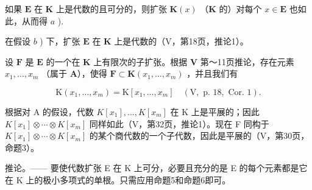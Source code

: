 如果 \(\mathbf{E}\) 在 \(\mathbf{K}\) 上是代数的且可分的，则扩张 \(\mathbf{K}(x)\) （\(\mathbf{K}\) 的）对每个 \(x \in \mathbf{E}\) 也如此，从而得 \(a\) ).

在假设 \(b\) ) 下，扩张 \(\mathbf{E}\) 在 \(\mathbf{K}\) 上是代数的（V，第18页，推论1）。

设 \(\mathbf{F}\) 是 \(\mathbf{E}\) 的一个在 \(\mathbf{K}\) 上有限次的子扩张。根据 \(\mathbf{V}\) 第～11页推论，存在元素 \(x_{1},\ldots ,x_{m}\) （属于 \(\mathbf{A}\)），使得 \(\mathbf{F}\subset \mathbf{K}(x_1,\dots,x_m)\) ，并且我们有

\[
\mathrm{K} \left(x _ {1}, \dots , x _ {m}\right) = \mathrm{K} \left[ x _ {1}, \dots , x _ {m} \right] \quad (\mathrm{V}, \text { p. } 1 8, \text { Cor. } 1).
\]

根据对 A 的假设，代数 \(K[x_{1}], \ldots, K[x_{m}]\) 在 K 上是平展的；因此 \(K[x_{1}] \otimes \cdots \otimes K[x_{m}]\) 同样如此（V，第32页，推论1）。现在 F 同构于 \(K[x_{1}] \otimes \cdots \otimes K[x_{m}]\) 的某个商代数的一个子代数，因此是平展的（V，第30页，命题3）。

推论。—— 要使代数扩张 E 在 K 上可分，必要且充分的是 E 的每个元素都是它在 K 上的极小多项式的单根。只需应用命题5和命题6即可。

